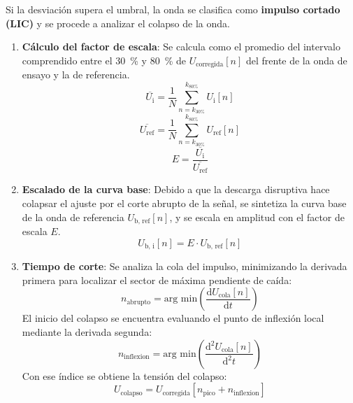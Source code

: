 Si la desviación supera el umbral, la onda se clasifica como \textbf{impulso cortado (LIC)} y se procede a analizar el colapso de la onda.
\begin{enumerate}[resume]
    \item \textbf{Cálculo del factor de escala}: Se calcula como el promedio del intervalo comprendido entre el \qty{30}{\percent} y \qty{80}{\percent} de $U_{\text{corregida}}[n]$ del frente de la onda de ensayo y la de referencia.
    \begin{equation}
        \overline{U_\text{i}} = \frac{1}{N} \sum_{n = k_{30\%}}^{k_{80\%}} U_\text{i}[n]
    \end{equation}
    \begin{equation}
        \overline{U_\text{ref}} = \frac{1}{N} \sum_{n = k_{30\%}}^{k_{80\%}} U_\text{ref}[n]
    \end{equation}
    \begin{equation}
        \label{eq:factor_escala_e}
        E = \frac{\overline{U_\text{i}}}{\overline{U_\text{ref}}}
    \end{equation}
    \item \textbf{Escalado de la curva base}: Debido a que la descarga disruptiva hace colapsar el ajuste por el corte abrupto de la señal, se sintetiza la curva base de la onda de referencia $U_\text{b, ref}[n]$, y se escala en amplitud con el factor de escala $E$.
    \begin{equation}
        \label{eq:curva_base_lic}
        U_\text{b, i}[n] = E \cdot U_\text{b, ref}[n]
    \end{equation}
    \item \textbf{Tiempo de corte}: Se analiza la cola del impulso, minimizando la derivada primera para localizar el sector de máxima pendiente de caída:
    \begin{equation}
        \label{eq:gradiente_colapso}
        n_\text{abrupto} = \text{arg min}\left(\frac{\text{d} U_{\text{cola}}[n]}{\text{d} t}\right)
    \end{equation}
    El inicio del colapso se encuentra evaluando el punto de inflexión local mediante la derivada segunda:
    \begin{equation}
        \label{eq:punto_inflexión}
        n_\text{inflexion} = \text{arg min}\left(\frac{\text{d}^2 U_\text{cola}[n]}{\text{d}^2 t}\right)
    \end{equation}
    Con ese índice se obtiene la tensión del colapso:
    \begin{equation}
        U_\text{colapso} = U_\text{corregida}[n_\text{pico} + n_\text{inflexion}]

\end{equation}
\end{enumerate}
